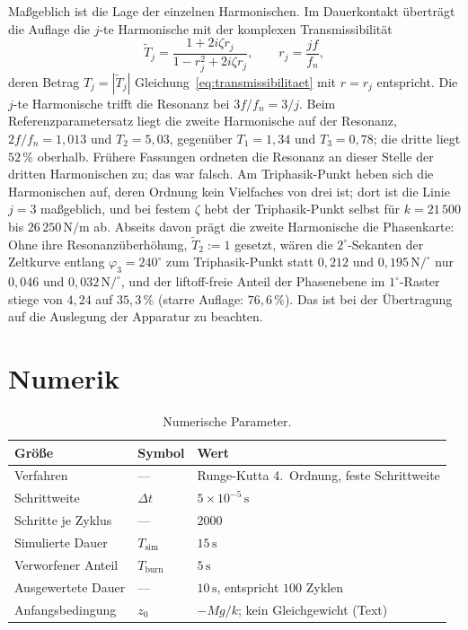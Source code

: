 \documentclass[12pt,a4paper]{report}
\begin{document}
Maßgeblich ist die Lage der einzelnen Harmonischen. Im Dauerkontakt
überträgt die Auflage die $j$-te Harmonische mit der komplexen
Transmissibilität
\begin{equation}
  \tilde{T}_j = \frac{1 + 2i\zeta r_j}{1 - r_j^{2} + 2i\zeta r_j},
  \qquad r_j = \frac{jf}{f_n},
  \label{eq:transmissibilitaet-j}
\end{equation}
deren Betrag $T_j = |\tilde{T}_j|$ Gleichung~\eqref{eq:transmissibilitaet}
mit $r = r_j$ entspricht. Die $j$-te Harmonische trifft die Resonanz bei
$3f/f_n = 3/j$. Beim Referenzparametersatz liegt die zweite Harmonische
auf der Resonanz, $2f/f_n = 1{,}013$ und $T_2 = 5{,}03$, gegenüber
$T_1 = 1{,}34$ und $T_3 = 0{,}78$; die dritte liegt $52\,\%$ oberhalb.
Frühere Fassungen ordneten die Resonanz an dieser Stelle der dritten
Harmonischen zu; das war falsch. Am Triphasik-Punkt heben sich die
Harmonischen auf, deren Ordnung kein Vielfaches von drei ist; dort ist
die Linie $j = 3$ maßgeblich, und bei festem $\zeta$ hebt der
Triphasik-Punkt selbst für $k = 21\,500$ bis $26\,250\,\mathrm{N/m}$ ab.
Abseits davon prägt die zweite Harmonische die Phasenkarte: Ohne ihre
Resonanzüberhöhung, $\tilde{T}_2 := 1$ gesetzt, wären die
$2^\circ$-Sekanten der Zeltkurve entlang $\varphi_3 = 240^\circ$ zum
Triphasik-Punkt statt $0{,}212$ und $0{,}195\,\mathrm{N/^\circ}$ nur
$0{,}046$ und $0{,}032\,\mathrm{N/^\circ}$, und der liftoff-freie Anteil
der Phasenebene im $1^\circ$-Raster stiege von $4{,}24$ auf $35{,}3\,\%$
(starre Auflage: $76{,}6\,\%$). Das ist bei der Übertragung auf die
Auslegung der Apparatur zu beachten.

\section{Numerik}
\label{sec:anh-numerik}

\begin{table}[htbp]
  \centering
  \begin{tabular}{lll}
    \hline
    Größe & Symbol & Wert \\
    \hline
    Verfahren           & ---                & Runge-Kutta 4.~Ordnung, feste Schrittweite \\
    Schrittweite        & $\Delta t$         & $5 \times 10^{-5}\,\mathrm{s}$ \\
    Schritte je Zyklus  & ---                & $2000$ \\
    Simulierte Dauer    & $T_{\mathrm{sim}}$ & $15\,\mathrm{s}$ \\
    Verworfener Anteil  & $T_{\mathrm{burn}}$& $5\,\mathrm{s}$ \\
    Ausgewertete Dauer  & ---                & $10\,\mathrm{s}$, entspricht $100$ Zyklen \\
    Anfangsbedingung    & $z_0$              & $-Mg/k$; kein Gleichgewicht (Text) \\
    \hline
  \end{tabular}
  \caption{Numerische Parameter.}
  \label{tab:numerik}
\end{table}
\end{document}
